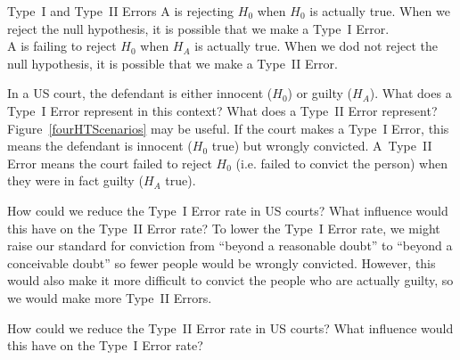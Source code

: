 \begin{onebox}{Type~I and Type~II Errors}
A  is rejecting $H_0$ when $H_0$ is actually true. When we reject the null hypothesis, it is possible that we make a Type~I Error. \\[2mm]
A  is failing to reject $H_0$ when $H_A$ is actually true. When we dod not reject the null hypothesis, it is possible that we make a Type~II Error.\end{onebox}



\begin{examplewrap}
\begin{nexample}{In a US court, the defendant is either innocent ($H_0$) or guilty ($H_A$). What does a Type~I Error represent in this context? What does a Type~II Error represent? Figure~\ref{fourHTScenarios} may be useful.}
If the court makes a Type~I Error, this means the defendant is innocent ($H_0$ true) but wrongly convicted. A~Type~II Error means the court failed to reject $H_0$ (i.e. failed to convict the person) when they were in fact guilty ($H_A$ true).
\end{nexample}
\end{examplewrap}

\begin{examplewrap}
\begin{nexample}{How could we reduce the Type~I Error rate in US courts? What influence would this have on the Type~II Error rate?}
To lower the Type~I Error rate, we might raise our standard for conviction from ``beyond a reasonable doubt'' to ``beyond a conceivable doubt'' so fewer people would be wrongly convicted. However, this would also make it more difficult to convict the people who are actually guilty, so we would make more Type~II Errors.
\end{nexample}
\end{examplewrap}

\begin{exercisewrap}
\begin{nexercise} \label{howToReduceType2ErrorsInUSCourts}
How could we reduce the Type~II Error rate in US courts? What influence would this have on the Type~I Error rate?\footnotemark
\end{nexercise}
\end{exercisewrap}

